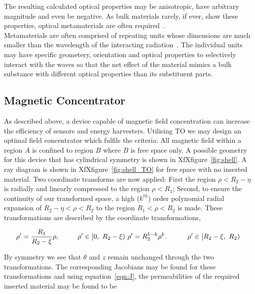 \documentclass[11pt]{iopart}
\begin{document}
The resulting calculated optical properties may be anisotropic, have
arbitrary magnitude and even be negative. As bulk materials rarely, if
ever, show these properties, optical metamaterials are often
required~\cite{META3}. \\

Metamaterials are often comprised of repeating units whose dimensions
are much smaller than the wavelength of the interacting
radiation~\cite{META2}. The individual units may have specific
geometery, orientation and optical properties to selectively interact
with the waves so that the net effect of the material mimics a bulk
substance with different optical properties than its substituent
parts.\\

\subsection{Magnetic Concentrator}
As described above, a device capable of magnetic field concentration
can increase the efficiency of sensors and energy harvesters.
Utilising TO we may design an optimal field concentrator which fulfils
the criteria: All magnetic field within a region $A$ is confined to
region $B$ where $B$ is free space only. A possible geometry for this
device that has cylindrical symmetry is shown in
XfXfigure~\ref{fig:shell}. A ray diagram
is shown in XfXfigure~\ref{fig:shell_TO} for free space with no
inserted material. Two coordinate transforms are now applied: First
the region $\rho < R_2 - \eta$ is radially and linearly compressed to
the region $\rho < R_1$; Second, to ensure the continuity of our
transformed space, a high ($k^{th}$) order polynomial radial expansion
of $R_2 - \eta < \rho < R_2$ to the region $R_1 < \rho < R_2$ is
made. These transformations are described by the coordinate
transformations,

\begin{equation}
  \label{transform}
\rho' = \frac{R_1}{R_2-\xi}\rho,~~~~~~~~\rho'\in[0,~R_2-\xi)~~\\
\rho' = R_2^{1-k}\rho^k.~~~~~~~~~\rho'\in[R_2-\xi,~R_2)
\end{equation}

By symmetry we see that $\theta$ and $z$ remain unchanged through the
two transformations. The corresponding Jacobians may be found for these transformations and using equation~\ref{eqn:J}, the permeabilities of the required inserted material may be found to be
\end{document}

